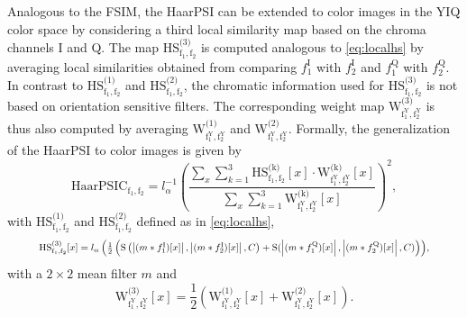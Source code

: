 \documentclass[11pt,a4paper]{article}
\newcommand{\abs}[1]{\left\vert#1\right\vert}
\newcommand{\Sim}{\operatorname{S}}
\begin{document}
Analogous to the FSIM, the HaarPSI can be extended to color images in the YIQ color space by considering a third local similarity map based on the chroma channels I and Q. The map $\operatorname{HS^\text{(3)}_{f_1,f_2}}$ is computed analogous to \eqref{eq:localhs} by averaging local similarities obtained from comparing $f^{\text{I}}_1$ with $f^{\text{I}}_2$ and $f^{\text{Q}}_1$ with $f^{\text{Q}}_2$. In contrast to $\operatorname{HS^\text{(1)}_{f_1,f_2}}$ and $\operatorname{HS^\text{(2)}_{f_1,f_2}}$, the chromatic information used for $\operatorname{HS^\text{(3)}_{f_1,f_2}}$ is not based on orientation sensitive filters. The corresponding weight map $\operatorname{W^\text{(3)}_{f^\text{Y}_1,f^\text{Y}_2}}$ is thus also computed by averaging $\operatorname{W^\text{(1)}_{f^\text{Y}_1,f^\text{Y}_2}}$ and $\operatorname{W^\text{(2)}_{f^\text{Y}_1,f^\text{Y}_2}}$. Formally, the generalization of the HaarPSI to color images is given by
\begin{equation}
\label{eq:haarpsic}
\operatorname{HaarPSIC_{f_1,f_2}} = l_\alpha^{-1}\left(\frac{\sum\limits_x \sum\limits_{k=1}^3\operatorname{HS^\text{(k)}_{f_1,f_2}}[x] \cdot \operatorname{W^\text{(k)}_{f^\text{Y}_1,f^\text{Y}_2}}[x]}{\sum\limits_x \sum\limits_{k=1}^3\operatorname{W^\text{(k)}_{f^\text{Y}_1,f^\text{Y}_2}}[x]}\right)^2, 
\end{equation}
with $\operatorname{HS^\text{(1)}_{f_1,f_2}}$ and $\operatorname{HS^\text{(2)}_{f_1,f_2}}$ defined as in \eqref{eq:localhs},
\begin{equation}
\label{eq:localhs3}
\resizebox{.9\hsize}{!}{$\operatorname{HS^\text{(3)}_{f_1,f_2}}[x]=l_\alpha\left(\frac{1}{2}\left(\Sim\left(\abs{(m*f^{\text{I}}_1)[x]},\abs{(m*f^{\text{I}}_2)[x]},C\right) + \Sim(\abs{(m*f^{\text{Q}}_1)[x]},\abs{(m*f^{\text{Q}}_2)[x]},C)\right)\right)$,}
\end{equation}
\setlength{\arraycolsep}{5pt}
with a $2\times2$ mean filter $m$ and
\begin{equation}
\operatorname{W^\text{(3)}_{f^\text{Y}_1,f^\text{Y}_2}}[x] = \frac{1}{2}\left(\operatorname{W^\text{(1)}_{f^\text{Y}_1,f^\text{Y}_2}}[x]+\operatorname{W^\text{(2)}_{f^\text{Y}_1,f^\text{Y}_2}}[x]\right).
\end{equation}
\end{document}
